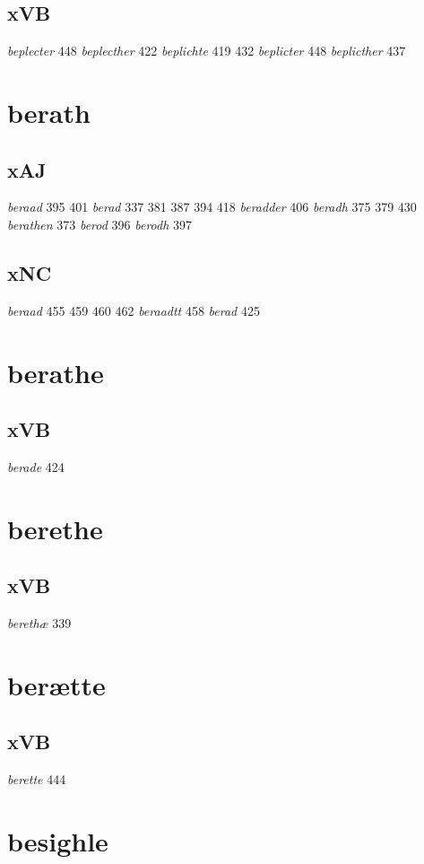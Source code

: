 \documentclass[a4paper,twocolumn]{article}
\begin{document}
\subsection{xVB}
\label{sec:org346621c}
\emph{beplecter} 448 \emph{beplecther} 422 \emph{beplichte} 419 432 \emph{beplicter} 448 \emph{beplicther} 437 
\section{berath}
\label{sec:org7dddf0c}
\subsection{xAJ}
\label{sec:orgce1e523}
\emph{beraad} 395 401 \emph{berad} 337 381 387 394 418 \emph{beradder} 406 \emph{beradh} 375 379 430 \emph{berathen} 373 \emph{berod} 396 \emph{berodh} 397 
\subsection{xNC}
\label{sec:org93151dd}
\emph{beraad} 455 459 460 462 \emph{beraadtt} 458 \emph{berad} 425 
\section{berathe}
\label{sec:org29ef29e}
\subsection{xVB}
\label{sec:org8ce43c1}
\emph{berade} 424 
\section{berethe}
\label{sec:org97c84cf}
\subsection{xVB}
\label{sec:org54d5ef6}
\emph{berethæ} 339 
\section{berætte}
\label{sec:org78eae32}
\subsection{xVB}
\label{sec:org5a1a9a3}
\emph{berette} 444 
\section{besighle}
\label{sec:org10602e7}
\end{document}
